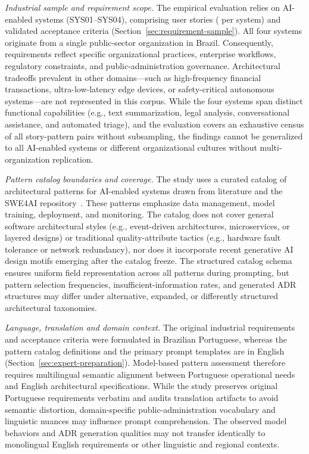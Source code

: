\emph{Industrial sample and requirement scope.}
The empirical evaluation relies on \StudySystemCount{} AI-enabled systems
(SYS01--SYS04), comprising \StudyStoryCount{} user stories
(\StudyStoriesPerSystem{} per system) and \StudyCriterionCount{} validated
acceptance criteria (Section~\ref{sec:requirement-sample}).
All four systems originate from a single public-sector organization in
Brazil. Consequently, requirements reflect specific organizational practices,
enterprise workflows, regulatory constraints, and public-administration
governance. Architectural tradeoffs prevalent in other domains---such as
high-frequency financial transactions, ultra-low-latency edge devices,
or safety-critical autonomous systems---are not represented in this corpus.
While the four systems span distinct functional capabilities (e.g., text
summarization, legal analysis, conversational assistance, and automated triage),
and the evaluation covers an exhaustive census of all \StudyAssessmentCount{}
story-pattern pairs without subsampling, the findings cannot be generalized
to all AI-enabled systems or different organizational cultures without
multi-organization replication.

\emph{Pattern catalog boundaries and coverage.}
The study uses a curated catalog of \StudyPatternCount{} architectural patterns
for AI-enabled systems drawn from literature and the SWE4AI
repository~\cite{heiland2023patterns,aiPatternsRepository}.
These patterns emphasize data management, model training, deployment, and
monitoring. The catalog does not cover general software architectural styles
(e.g., event-driven architectures, microservices, or layered designs) or
traditional quality-attribute tactics (e.g., hardware fault tolerance or
network redundancy), nor does it incorporate recent generative AI design
motifs emerging after the catalog freeze.
The structured catalog schema ensures uniform field representation
across all \StudyPatternCount{} patterns during prompting, but pattern
selection frequencies, insufficient-information rates, and generated ADR
structures may differ under alternative, expanded, or differently structured
architectural taxonomies.

\emph{Language, translation and domain context.}
The original industrial requirements and acceptance criteria were formulated
in Brazilian Portuguese, whereas the pattern catalog definitions and the
primary prompt templates are in English (Section~\ref{sec:expert-preparation}).
Model-based pattern assessment therefore requires multilingual semantic
alignment between Portuguese operational needs and English architectural
specifications. While the study preserves original Portuguese requirements
verbatim and audits translation artifacts to avoid semantic distortion,
domain-specific public-administration vocabulary and linguistic nuances
may influence prompt comprehension. The observed model behaviors and
ADR generation qualities may not transfer identically to monolingual
English requirements or other linguistic and regional contexts.

